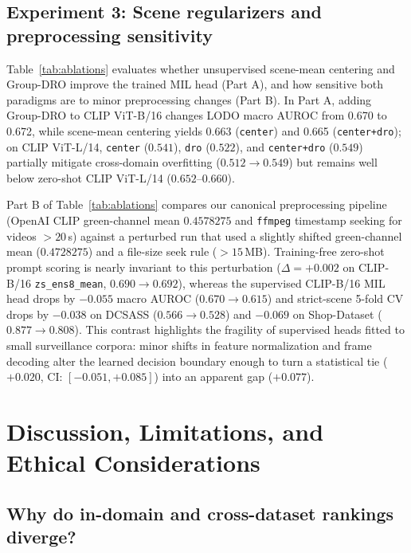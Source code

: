 \documentclass[pdflatex,sn-mathphys-num]{sn-jnl}
\begin{document}
\subsection{Experiment 3: Scene regularizers and preprocessing sensitivity}\label{sec:ablations}

Table~\ref{tab:ablations} evaluates whether unsupervised scene-mean centering and Group-DRO improve the trained MIL head (Part A), and how sensitive both paradigms are to minor preprocessing changes (Part B). In Part A, adding Group-DRO to CLIP ViT-B/16 changes LODO macro AUROC from 0.670 to 0.672, while scene-mean centering yields 0.663 (\texttt{center}) and 0.665 (\texttt{center+dro}); on CLIP ViT-L/14, \texttt{center} ($0.541$), \texttt{dro} ($0.522$), and \texttt{center+dro} ($0.549$) partially mitigate cross-domain overfitting ($0.512 \to 0.549$) but remains well below zero-shot CLIP ViT-L/14 ($0.652$--$0.660$).

\TableAblations

Part B of Table~\ref{tab:ablations} compares our canonical preprocessing pipeline (OpenAI CLIP green-channel mean $0.4578275$ and \texttt{ffmpeg} timestamp seeking for videos $>20$\,s) against a perturbed run that used a slightly shifted green-channel mean ($0.4728275$) and a file-size seek rule ($>15$\,MB). Training-free zero-shot prompt scoring is nearly invariant to this perturbation ($\Delta = +0.002$ on CLIP-B/16 \texttt{zs\_ens8\_mean}, $0.690 \to 0.692$), whereas the supervised CLIP-B/16 MIL head drops by $-0.055$ macro AUROC ($0.670 \to 0.615$) and strict-scene 5-fold CV drops by $-0.038$ on DCSASS ($0.566 \to 0.528$) and $-0.069$ on Shop-Dataset ($0.877 \to 0.808$). This contrast highlights the fragility of supervised heads fitted to small surveillance corpora: minor shifts in feature normalization and frame decoding alter the learned decision boundary enough to turn a statistical tie ($+0.020$, CI: $[-0.051, +0.085]$) into an apparent gap ($+0.077$).

\section{Discussion, Limitations, and Ethical Considerations}\label{sec:discussion}

\subsection{Why do in-domain and cross-dataset rankings diverge?}
\end{document}
